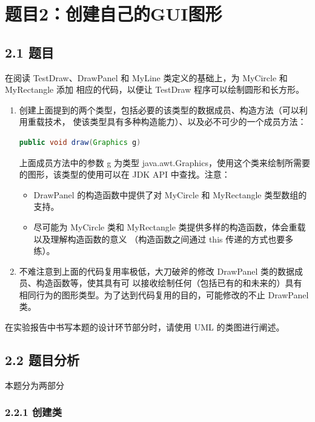 \vspace{-3cm}\chapter{题目2：创建自己的GUI图形}

\section{2.1 题目}

在阅读 TestDraw、DrawPanel 和 MyLine 类定义的基础上，为 MyCircle 和 MyRectangle 添加
相应的代码，以便让 TestDraw 程序可以绘制圆形和长方形。
\begin{enumerate}
	\item 创建上面提到的两个类型，包括必要的该类型的数据成员、构造方法（可以利用重载技术，
		使该类型具有多种构造能力）、以及必不可少的一个成员方法：
		\begin{lstlisting}[language = Java]
	public void draw(Graphics g)
		\end{lstlisting}
		上面成员方法中的参数 g 为类型 java.awt.Graphics，使用这个类来绘制所需要的图形，该类型的使用可以在 JDK API 中查找。注意：
		\begin{itemize}
			\item DrawPanel 的构造函数中提供了对 MyCircle 和 MyRectangle 类型数组的支持。
			\item 尽可能为 MyCircle 类和 MyRectangle 类提供多样的构造函数，体会重载以及理解构造函数的意义
			（构造函数之间通过 this 传递的方式也要多练）。
		\end{itemize}
	\item 不难注意到上面的代码复用率极低，大刀破斧的修改 DrawPanel 类的数据成员、构造函数等，使其具有可
		以接收绘制任何（包括已有的和未来的）具有相同行为的图形类型。为了达到代码复用的目的，可能修改的不止 DrawPanel 类。
\end{enumerate}
	
在实验报告中书写本题的设计环节部分时，请使用 UML 的类图进行阐述。

\section{2.2 题目分析}
本题分为两部分

\subsection{2.2.1 创建类}

